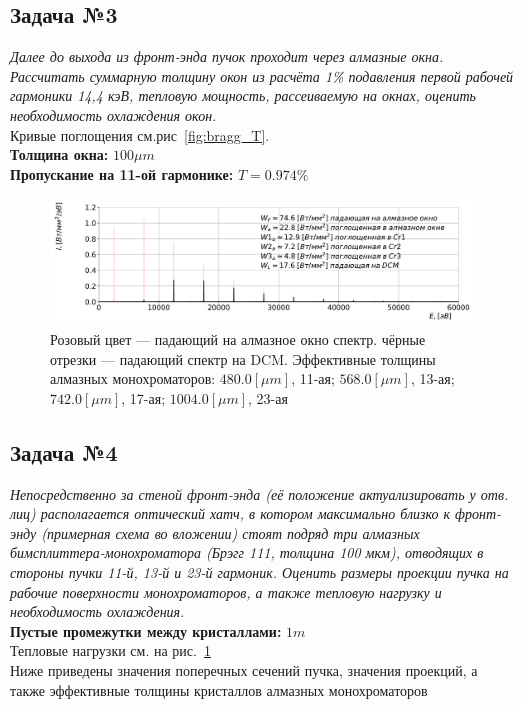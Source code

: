 \documentclass[14pt,a4paper]{extarticle}
\numberwithin{equation}{section}
\begin{document}
\subsection{Задача №3}
\textit{Далее до выхода из фронт-энда пучок проходит через алмазные окна. Рассчитать суммарную толщину окон из расчёта 1\% подавления первой рабочей гармоники 14,4 кэВ, тепловую мощность, рассеиваемую на окнах, оценить необходимость охлаждения окон.}\\
Кривые поглощения см.рис~\ref{fig:bragg_T}.\\
\textbf{Толщина окна:} $100\mu m$\\
\textbf{Пропускание на 11-ой гармонике:} $T = 0.974 \%$\\
\begin{figure}[htbp]
	\centering  
	\includegraphics[width=\textwidth]{pic/spec.pdf}
	\caption{Розовый цвет --- падающий на алмазное окно спектр. 
		чёрные отрезки --- падающий спектр на DCM. Эффективные толщины алмазных монохроматоров: $480.0 [\mu m]$, 11-ая; $568.0 [\mu m]$, 13-ая; $742.0 [\mu m]$, 17-ая; $1004.0 [\mu m]$, 23-ая}
	\label{fig:absorb_spec}
	
\end{figure}


\subsection{Задача №4}
\textit{Непосредственно за стеной фронт-энда (её положение актуализировать у отв. лиц) располагается оптический хатч, в котором максимально близко к фронт-энду (примерная схема во вложении) стоят подряд три алмазных бимсплиттера-монохроматора (Брэгг 111, толщина 100 мкм), отводящих в стороны пучки 11-й, 13-й и 23-й гармоник. Оценить размеры проекции пучка на рабочие поверхности монохроматоров, а также тепловую нагрузку и необходимость охлаждения.}\\
\textbf{Пустые промежутки между кристаллами:} $1m$\\
Тепловые нагрузки см. на рис.~\ref{fig:absorb_spec}\\
Ниже приведены значения поперечных сечений пучка, значения проекций, а также эффективные толщины кристаллов алмазных монохроматоров\\
\end{document}
